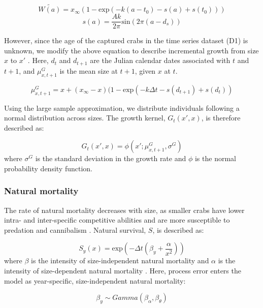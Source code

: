 \documentclass{article}
\begin{document}
\begin{equation}
\widetilde{W(a)} = x_{\infty}(1-\text{exp}(-k(a-t_0) - s(a) + s(t_0)))
\end{equation}
\begin{equation}
s(a) = \frac{Ak}{2\pi} \text{sin}(2\pi(a-d_s)) 
\end{equation}

However, since the age of the captured crabs in the time series dataset (D1) is unknown, we modify the above equation to describe incremental growth from size $x$ to $x'$ \parencite{white2016fitting}. Here, $d_t$ and $d_{t+1}$ are the Julian calendar dates associated with $t$ and $t+1$, and $\mu^G_{x,t+1}$ is the mean size at $t+1$, given $x$ at $t$.

\begin{equation}
\mu^G_{x,t+1} = x + (x_{\infty}-x)(1-\text{exp}(-k\Delta t-s(d_{t+1})+s(d_t))
\end{equation}

Using the large sample approximation, we distribute individuals following a normal distribution across sizes. The growth kernel, $G_t(x',x)$, is therefore described as:

\begin{equation}
G_t(x',x) = \phi(x'; \mu^G_{x, t+1}, \sigma^G)
\end{equation}
where $\sigma^G$ is the standard deviation in the growth rate and $\phi$ is the normal probability density function.

\subsubsection*{Natural mortality}

The rate of natural mortality decreases with size, as smaller crabs have lower intra- and inter-specific competitive abilities and are more susceptible to predation and cannibalism \parencite{maszczyk2018body, grosholz2021stage}. Natural survival, $S$, is described as: 

\begin{equation}
S_y(x) = \text{exp}\left(-\Delta t(\beta_y+\frac{\alpha}{x^2})\right)
\end{equation}
where $\beta$ is the intensity of size-independent natural mortality and $\alpha$ is the intensity of size-dependent natural mortality \parencite{carlson2010bayesian}. Here, process error enters the model as year-specific, size-independent natural mortality:

\begin{equation}
\beta_y \sim Gamma(\beta_{\alpha}, \beta_{\theta})
\end{equation}
\end{document}
